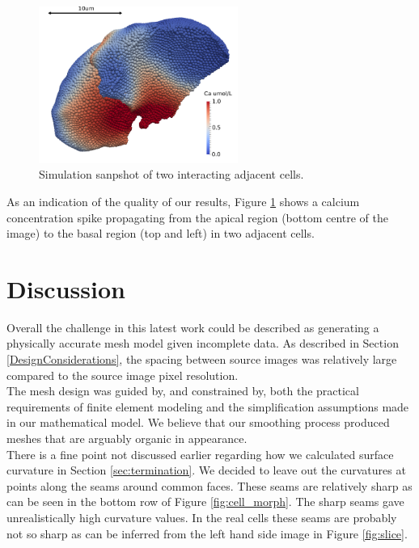\documentclass[a4paper,10pt]{article}
\begin{document}
\begin{figure}[H]
\begin{center}
\includegraphics[width=0.58\textwidth]{images/2cells_crop.pdf}
\end{center}
\caption{Simulation sanpshot of two interacting adjacent cells.}
\label{fig:two_cells}
\end{figure}

As an indication of the quality of our results, Figure \ref{fig:two_cells} shows a calcium concentration spike propagating from the apical region (bottom centre of the image) to the basal region (top and left) in two adjacent cells.\\ 

\section{Discussion}

Overall the challenge in this latest work could be described as generating a physically accurate mesh model given incomplete data. As described in Section \ref{DesignConsiderations}, the spacing between source images was relatively large compared to the source image pixel resolution.\\

The mesh design was guided by, and constrained by, both the practical requirements of finite element modeling and the simplification assumptions made in our mathematical model. We believe that our smoothing process produced meshes that are arguably organic in appearance.\\ 

There is a fine point not discussed earlier regarding how we calculated surface curvature in Section \ref{sec:termination}. We decided to leave out the curvatures at points along the seams around common faces. These seams are relatively sharp as can be seen in the bottom row of Figure \ref{fig:cell_morph}. The sharp seams gave unrealistically high curvature values. In the real cells these seams are probably not so sharp as can be inferred from the left hand side image in Figure \ref{fig:slice}.\\
\end{document}
